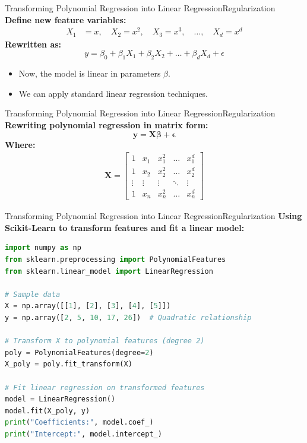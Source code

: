 \documentclass[11pt]{beamer}
\begin{document}
%
%
\begin{frame}{Transforming Polynomial Regression into Linear Regression}{Regularization}
    \textbf{Define new feature variables:}
    \begin{align*}
        X_1 &= x, \quad X_2 = x^2, \quad X_3 = x^3, \quad \dots, \quad X_d = x^d
    \end{align*}
    \textbf{Rewritten as:}
    \begin{equation}
        y = \beta_0 + \beta_1 X_1 + \beta_2 X_2 + \dots + \beta_d X_d + \epsilon
    \end{equation}
    \begin{itemize}
        \item Now, the model is linear in parameters $\beta$.
        \item We can apply standard linear regression techniques.
    \end{itemize}
\end{frame}
%
%
\begin{frame}{Transforming Polynomial Regression into Linear Regression}{Regularization}
    \textbf{Rewriting polynomial regression in matrix form:}
    \begin{equation}
        \mathbf{y} = \mathbf{X} \boldsymbol{\beta} + \boldsymbol{\epsilon}
    \end{equation}
    \textbf{Where:}
    \begin{align*}
        \mathbf{X} = \begin{bmatrix}
            1 & x_1 & x_1^2 & \dots & x_1^d \\
            1 & x_2 & x_2^2 & \dots & x_2^d \\
            \vdots & \vdots & \vdots & \ddots & \vdots \\
            1 & x_n & x_n^2 & \dots & x_n^d
        \end{bmatrix}
    \end{align*}
\end{frame}
%
%
\begin{frame}[fragile]{Transforming Polynomial Regression into Linear Regression}{Regularization}
    \textbf{Using Scikit-Learn to transform features and fit a linear model:}
    \footnotesize{
    \begin{lstlisting}[language=Python, basicstyle=\footnotesize\ttfamily]
import numpy as np
from sklearn.preprocessing import PolynomialFeatures
from sklearn.linear_model import LinearRegression

# Sample data
X = np.array([[1], [2], [3], [4], [5]])
y = np.array([2, 5, 10, 17, 26])  # Quadratic relationship

# Transform X to polynomial features (degree 2)
poly = PolynomialFeatures(degree=2)
X_poly = poly.fit_transform(X)

# Fit linear regression on transformed features
model = LinearRegression()
model.fit(X_poly, y)
print("Coefficients:", model.coef_)
print("Intercept:", model.intercept_)
    \end{lstlisting}}
\end{frame}
\end{document}
